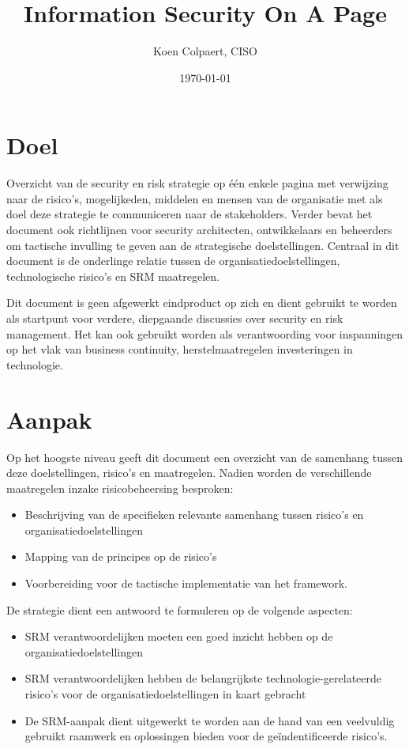\documentclass[11pt]{article}
\author{Koen Colpaert, CISO}
\date{\today}
\title{Information Security On A Page}
\begin{document}
\maketitle
\tableofcontents


\section{Doel}
\label{sec:org037ef11}
Overzicht van de security en risk strategie op één enkele pagina met verwijzing naar de risico's, mogelijkeden, middelen en mensen van de organisatie met als doel deze strategie te communiceren 
naar de stakeholders. Verder bevat het document ook richtlijnen voor security architecten, ontwikkelaars en beheerders om tactische invulling te geven aan de strategische doelstellingen.
Centraal in dit document is de onderlinge relatie tussen de organisatiedoelstellingen, technologische risico's en SRM maatregelen.

Dit document is geen afgewerkt eindproduct op zich en dient gebruikt te worden als startpunt voor verdere, diepgaande discussies over security en risk management. Het kan ook gebruikt worden als
verantwoording voor inspanningen op het vlak van business continuity, herstelmaatregelen investeringen in technologie.

\section{Aanpak}
\label{sec:orgc218b0f}
Op het hoogste niveau geeft dit document een overzicht van de samenhang tussen deze doelstellingen, risico's en maatregelen. Nadien worden de verschillende maatregelen inzake risicobeheersing besproken:
\begin{itemize}
\item Beschrijving van de specifieken relevante samenhang tussen risico's en organisatiedoelstellingen
\item Mapping van de principes op de risico's
\item Voorbereiding voor de tactische implementatie van het framework.
\end{itemize}

De strategie dient een antwoord te formuleren op de volgende aspecten:
\begin{itemize}
\item SRM verantwoordelijken moeten een goed inzicht hebben op de organisatiedoelstellingen
\item SRM verantwoordelijken hebben de belangrijkste technologie-gerelateerde risico's voor de organisatiedoelstellingen in kaart gebracht
\item De SRM-aanpak dient uitgewerkt te worden aan de hand van een veelvuldig gebruikt raamwerk en oplossingen bieden voor de geïndentificeerde risico's.
\end{itemize}
\end{document}
